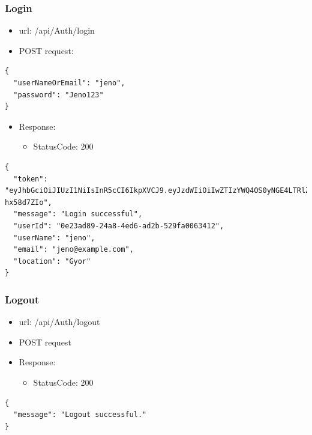 \documentclass[11pt]{article}
\begin{document}
\subsubsection{Login}
\label{sec:orga869092}
\begin{itemize}
\item url: /api/Auth/login
\item POST request:
\end{itemize}
\begin{verbatim}
{
  "userNameOrEmail": "jeno",
  "password": "Jeno123"
}
\end{verbatim}
\begin{itemize}
\item Response:
\begin{itemize}
\item StatusCode: 200
\end{itemize}
\end{itemize}
\begin{verbatim}
{
  "token": "eyJhbGciOiJIUzI1NiIsInR5cCI6IkpXVCJ9.eyJzdWIiOiIwZTIzYWQ4OS0yNGE4LTRlZDYtYWQyYi01MjlmYTAwNjM0MTIiLCJlbWFpbCI6Implbm9AZXhhbXBsZS5jb20iLCJ1bmlxdWVfbmFtZSI6Implbm8iLCJsb2NhdGlvbiI6Ikd5b3IiLCJodHRwOi8vc2NoZW1hcy5taWNyb3NvZnQuY29tL3dzLzIwMDgvMDYvaWRlbnRpdHkvY2xhaW1zL3JvbGUiOiJVc2VyIiwiZXhwIjoxNzQ2MTExNDc0LCJpc3MiOiJodHRwczovL3VuaXBvaW50LWI2aDZoNGN1Ym5jbWFmaGgucG9sYW5kY2VudHJhbC0wMS5henVyZXdlYnNpdGVzLm5ldCIsImF1ZCI6Imh0dHBzOi8vdW5pcG9pbnQtYjZoNmg0Y3VibmNtYWZoaC5wb2xhbmRjZW50cmFsLTAxLmF6dXJld2Vic2l0ZXMubmV0In0.Yqrw_p9m6FfKP49J7GGXv4539PPOohrFo-hx58d7ZIo",
  "message": "Login successful",
  "userId": "0e23ad89-24a8-4ed6-ad2b-529fa0063412",
  "userName": "jeno",
  "email": "jeno@example.com",
  "location": "Gyor"
}
\end{verbatim}
\subsubsection{Logout}
\label{sec:orga6be9e0}
\begin{itemize}
\item url: /api/Auth/logout
\item POST request
\item Response:
\begin{itemize}
\item StatusCode: 200
\end{itemize}
\end{itemize}
\begin{verbatim}
{
  "message": "Logout successful."
}
\end{verbatim}
\end{document}
